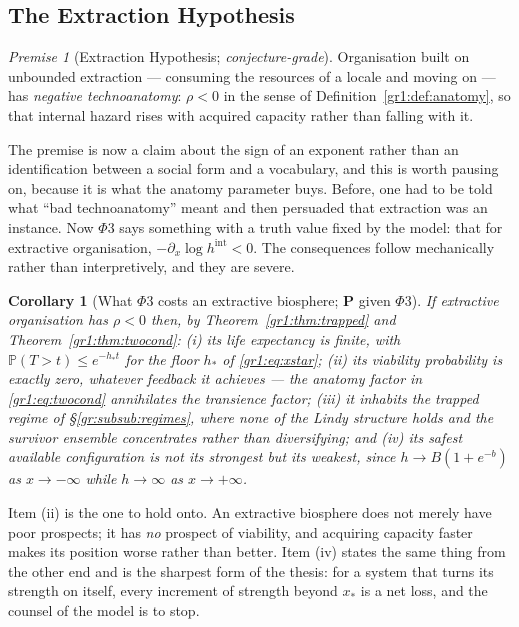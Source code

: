 \documentclass[11pt]{article}
\numberwithin{equation}{section}
\theoremstyle{plain}
\newtheorem{corollary}[theorem]{Corollary}
\theoremstyle{definition}
\theoremstyle{remark}
\newcommand{\PP}{\mathbb{P}}
\newtheorem{premise}{Premise}
\begin{document}
\subsection{The Extraction Hypothesis}\label{gr:sub:extraction}

\begin{premise}[Extraction Hypothesis; \emph{conjecture-grade}]
\label{gr:phi3}
Organisation built on unbounded extraction --- consuming the resources
of a locale and moving on --- has \emph{negative technoanatomy}:
$\rho<0$ in the sense of Definition~\ref{gr1:def:anatomy}, so that
internal hazard rises with acquired capacity rather than falling with
it.
\end{premise}

The premise is now a claim about the sign of an exponent rather than an
identification between a social form and a vocabulary, and this is worth
pausing on, because it is what the anatomy parameter buys. Before, one
had to be told what ``bad technoanatomy'' meant and then persuaded that
extraction was an instance. Now $\Phi3$ says something with a truth
value fixed by the model: that for extractive organisation,
$-\partial_x\log h^{\mathrm{int}}<0$. The consequences follow
mechanically rather than interpretively, and they are severe.

\begin{corollary}[What $\Phi3$ costs an extractive biosphere; \textbf{P}
given $\Phi3$]\label{gr:cor:extractcost}
If extractive organisation has $\rho<0$ then, by
Theorem~\ref{gr1:thm:trapped} and Theorem~\ref{gr1:thm:twocond}:
\emph{(i)} its life expectancy is finite, with
$\PP(T>t)\le e^{-h_\ast t}$ for the floor $h_\ast$ of
\eqref{gr1:eq:xstar};
\emph{(ii)} its viability probability is \emph{exactly zero}, whatever
feedback it achieves --- the anatomy factor in \eqref{gr1:eq:twocond}
annihilates the transience factor;
\emph{(iii)} it inhabits the trapped regime of
\S\ref{gr:subsub:regimes}, where none of the Lindy structure holds and
the survivor ensemble concentrates rather than diversifying;
and \emph{(iv)} its safest available configuration is not its strongest
but its \emph{weakest}, since $h\to B(1+e^{-b})$ as $x\to-\infty$ while
$h\to\infty$ as $x\to+\infty$.
\end{corollary}

\noindent Item (ii) is the one to hold onto. An extractive biosphere
does not merely have poor prospects; it has \emph{no} prospect of
viability, and acquiring capacity faster makes its position worse rather
than better. Item (iv) states the same thing from the other end and is
the sharpest form of the thesis: for a system that turns its strength on
itself, every increment of strength beyond $x_\ast$ is a net loss, and
the counsel of the model is to stop.
\end{document}
